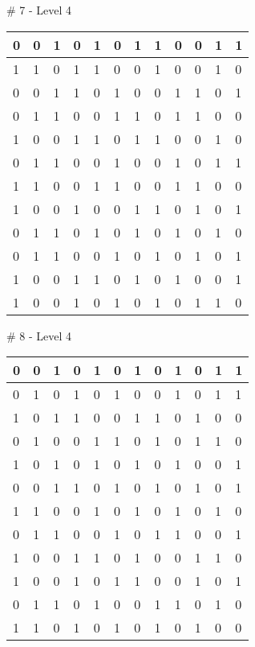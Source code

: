 \smallskip

\# 7 - Level 4 \newline
\begin{tabular}{|m{\collen}|m{\collen}|m{\collen}|m{\collen}|m{\collen}|m{\collen}|m{\collen}|m{\collen}|m{\collen}|m{\collen}|m{\collen}|m{\collen}|}
\hline
  0 & 0 & 1 & 0 & 1 & 0 & 1 & 1 & 0 & 0 & 1 & 1 \\
\hline
  1 & 1 & 0 & 1 & 1 & 0 & 0 & 1 & 0 & 0 & 1 & 0 \\
\hline
  0 & 0 & 1 & 1 & 0 & 1 & 0 & 0 & 1 & 1 & 0 & 1 \\
\hline
  0 & 1 & 1 & 0 & 0 & 1 & 1 & 0 & 1 & 1 & 0 & 0 \\
\hline
  1 & 0 & 0 & 1 & 1 & 0 & 1 & 1 & 0 & 0 & 1 & 0 \\
\hline
  0 & 1 & 1 & 0 & 0 & 1 & 0 & 0 & 1 & 0 & 1 & 1 \\
\hline
  1 & 1 & 0 & 0 & 1 & 1 & 0 & 0 & 1 & 1 & 0 & 0 \\
\hline
  1 & 0 & 0 & 1 & 0 & 0 & 1 & 1 & 0 & 1 & 0 & 1 \\
\hline
  0 & 1 & 1 & 0 & 1 & 0 & 1 & 0 & 1 & 0 & 1 & 0 \\
\hline
  0 & 1 & 1 & 0 & 0 & 1 & 0 & 1 & 0 & 1 & 0 & 1 \\
\hline
  1 & 0 & 0 & 1 & 1 & 0 & 1 & 0 & 1 & 0 & 0 & 1 \\
\hline
  1 & 0 & 0 & 1 & 0 & 1 & 0 & 1 & 0 & 1 & 1 & 0 \\
\hline
\end{tabular}


\smallskip

\# 8 - Level 4 \newline
\begin{tabular}{|m{\collen}|m{\collen}|m{\collen}|m{\collen}|m{\collen}|m{\collen}|m{\collen}|m{\collen}|m{\collen}|m{\collen}|m{\collen}|m{\collen}|}
\hline
  0 & 0 & 1 & 0 & 1 & 0 & 1 & 0 & 1 & 0 & 1 & 1 \\
\hline
  0 & 1 & 0 & 1 & 0 & 1 & 0 & 0 & 1 & 0 & 1 & 1 \\
\hline
  1 & 0 & 1 & 1 & 0 & 0 & 1 & 1 & 0 & 1 & 0 & 0 \\
\hline
  0 & 1 & 0 & 0 & 1 & 1 & 0 & 1 & 0 & 1 & 1 & 0 \\
\hline
  1 & 0 & 1 & 0 & 1 & 0 & 1 & 0 & 1 & 0 & 0 & 1 \\
\hline
  0 & 0 & 1 & 1 & 0 & 1 & 0 & 1 & 0 & 1 & 0 & 1 \\
\hline
  1 & 1 & 0 & 0 & 1 & 0 & 1 & 0 & 1 & 0 & 1 & 0 \\
\hline
  0 & 1 & 1 & 0 & 0 & 1 & 0 & 1 & 1 & 0 & 0 & 1 \\
\hline
  1 & 0 & 0 & 1 & 1 & 0 & 1 & 0 & 0 & 1 & 1 & 0 \\
\hline
  1 & 0 & 0 & 1 & 0 & 1 & 1 & 0 & 0 & 1 & 0 & 1 \\
\hline
  0 & 1 & 1 & 0 & 1 & 0 & 0 & 1 & 1 & 0 & 1 & 0 \\
\hline
  1 & 1 & 0 & 1 & 0 & 1 & 0 & 1 & 0 & 1 & 0 & 0 \\
\hline
\end{tabular}


